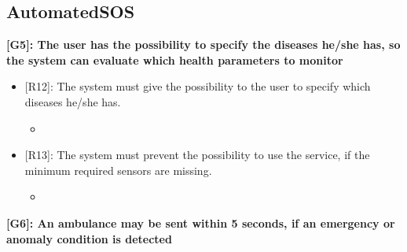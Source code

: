 {\color{Blue}\subsection{AutomatedSOS}}
\raggedright
\textbf{[G5]: The user has the possibility to specify the diseases he/she has, so the system can evaluate which health parameters to monitor}

\begin{itemize}
	\item {[R12]: The system must give the possibility to the user to specify which diseases he/she has.}
	\begin{itemize}
		\item {}
	\end{itemize}   
	\item {[R13]: The system must prevent the possibility to use the service, if the minimum required sensors are missing.}
	\begin{itemize}
		\item {}
	\end{itemize}   
\end{itemize}

\textbf{[G6]: An ambulance may be sent within 5 seconds, if an emergency or anomaly condition is detected}

